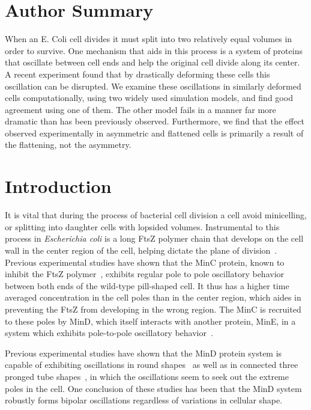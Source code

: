 \documentclass[10pt,letterpaper]{article}
\begin{document}
\section*{Author Summary}
  When an E. Coli cell divides it must split into two relatively equal
  volumes in order to survive.  One mechanism that aids in this
  process is a system of proteins that oscillate between cell ends and
  help the original cell divide along its center.  A recent
  experiment found that by drastically deforming these cells this
  oscillation can be disrupted.  We examine these oscillations in
  similarly deformed cells computationally, using two widely used
  simulation models, and find good agreement using one of them.  The
  other model fails in a manner far more dramatic than has been
  previously observed.  Furthermore, we find that the effect observed
  experimentally in asymmetric and flattened cells is primarily a
  result of the flattening, not the asymmetry.

\linenumbers

\section*{Introduction}
It is vital that during the process of bacterial cell
division a cell avoid minicelling, or splitting into daughter cells
with lopsided volumes.  Instrumental to this process in
\emph{Escherichia coli} is a long FtsZ polymer chain that develops on
the cell wall in the center region of the cell, helping dictate the
plane of division~\cite{adams2009bacterial,
  lutkenhaus2007assembly}. Previous experimental studies have shown
that the MinC protein, known to inhibit the FtsZ
polymer~\cite{shen2010examination}, exhibits regular pole to pole
oscillatory behavior between both ends of the wild-type pill-shaped
cell.  It thus has a higher time averaged concentration in the cell
poles than in the center region, which aides in preventing the FtsZ
from developing in the wrong region.  The MinC is recruited to these
poles by MinD, which itself interacts with another protein, MinE, in a
system which exhibits pole-to-pole oscillatory
behavior~\cite{shapiro2009and, yu1999ftsz,
  meacci2005min,huang2003dynamic,kerr2006division,mannik2009bacterial}.

Previous experimental studies have shown that the MinD protein system
is capable of exhibiting oscillations in round
shapes~\cite{fange2006noise} as well as in connected three pronged
tube shapes~\cite{varma2008min}, in which the oscillations seem to
seek out the extreme poles in the cell.  One conclusion of these
studies has been that the MinD system robustly forms bipolar
oscillations regardless of variations in cellular shape.
\end{document}
